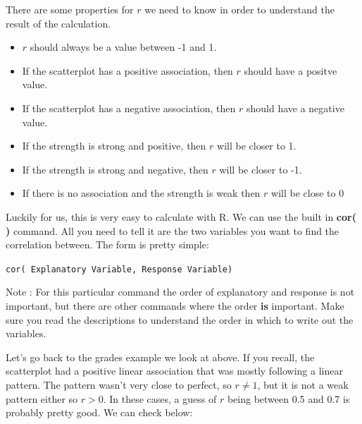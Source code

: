 \documentclass[
  letterpaper,
  DIV=11,
  numbers=noendperiod]{scrreprt}
\newenvironment{Shaded}{\begin{snugshade}}{\end{snugshade}}
\newcommand{\CommentTok}[1]{\textcolor[rgb]{0.37,0.37,0.37}{#1}}
\newcommand{\FunctionTok}[1]{\textcolor[rgb]{0.28,0.35,0.67}{#1}}
\newcommand{\NormalTok}[1]{\textcolor[rgb]{0.00,0.23,0.31}{#1}}
\newcommand{\OtherTok}[1]{\textcolor[rgb]{0.00,0.23,0.31}{#1}}
\newcommand{\SpecialCharTok}[1]{\textcolor[rgb]{0.37,0.37,0.37}{#1}}
\providecommand{\tightlist}{%
  \setlength{\itemsep}{0pt}\setlength{\parskip}{0pt}}\usepackage{longtable,booktabs,array}
\begin{document}
There are some properties for \(r\) we need to know in order to
understand the result of the calculation.

\begin{itemize}
\tightlist
\item
  \(r\) should always be a value between -1 and 1.
\item
  If the scatterplot has a positive association, then \(r\) should have
  a positve value.
\item
  If the scatterplot has a negative association, then \(r\) should have
  a negative value.
\item
  If the strength is strong and positive, then \(r\) will be closer to
  1.
\item
  If the strength is strong and negative, then \(r\) will be closer to
  -1.
\item
  If there is no association and the strength is weak then \(r\) will be
  close to \(0\)
\end{itemize}

Luckily for us, this is very easy to calculate with R. We can use the
built in \textbf{cor( )} command. All you need to tell it are the two
variables you want to find the correlation between. The form is pretty
simple:

\texttt{cor(\ Explanatory\ Variable,\ Response\ Variable)}

Note : For this particular command the order of explanatory and response
is not important, but there are other commands where the order
\textbf{is} important. Make sure you read the descriptions to understand
the order in which to write out the variables.

Let's go back to the grades example we look at above. If you recall, the
scatterplot had a positive linear association that was mostly following
a linear pattern. The pattern wasn't very close to perfect, so
\(r \neq 1\), but it is not a weak pattern either so \(r > 0\). In these
cases, a guess of \(r\) being between 0.5 and 0.7 is probably pretty
good. We can check below:

\begin{Shaded}
\end{Shaded}
\end{document}
